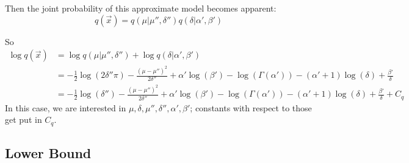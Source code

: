 \documentclass[12pt]{article}
\begin{document}
\begin{appendices}
\begin{center}
\begin{tikzpicture}[->, >=stealth, thick, scale=3.0]
\end{tikzpicture}
\end{center}

Then the joint probability of this approximate model becomes apparent:
\begin{equation}
    q(\vec{x}) = q(\mu|\mu'', \delta'')q(\delta|\alpha', \beta')
\end{equation}

So
\begin{align}
    \log{q(\vec{x})} &= \log{q(\mu|\mu'', \delta'')} + \log{q(\delta|\alpha', \beta')}
    \nonumber \\
    &= -\frac{1}{2} \log{(2\delta''\pi)} - \frac{(\mu - \mu'')^{2}}{2\delta''} +
    \alpha' \log{(\beta')} - \log{(\Gamma(\alpha'))} - (\alpha' + 1) \log{(\delta)}
    + \frac{\beta'}{\delta}
    \nonumber \\
    &= -\frac{1}{2} \log{(\delta'')} - \frac{(\mu - \mu'')^{2}}{2\delta''} +
    \alpha' \log{(\beta')} - \log{(\Gamma(\alpha'))} - (\alpha' + 1) \log{(\delta)}
    + \frac{\beta'}{\delta} + C_q
\end{align}
In this case, we are interested in $\mu, \delta, \mu'', \delta'', \alpha',
\beta'$; constants with respect to those get put in $C_q$.

\subsection{Lower Bound}


\end{appendices}
\end{document}
